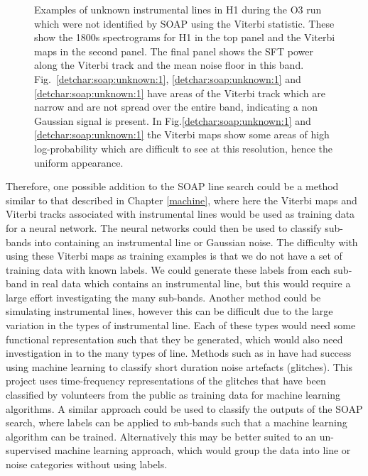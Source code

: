 \begin{figure}[hpt]
	\caption[lines from unknown sources]{Examples of unknown instrumental lines in H1 during the O3 run which were not identified by SOAP using the Viterbi statistic. These show the 1800s spectrograms for H1 in the top panel and the Viterbi maps in the second panel. The final panel shows the \gls{SFT} power along the Viterbi track and the mean noise floor in this band.  Fig.~\ref{detchar:soap:unknown:1}, \ref{detchar:soap:unknown:1} and \ref{detchar:soap:unknown:1} have areas of the Viterbi track which are narrow and are not spread over the entire band, indicating a non Gaussian signal is present. In Fig.\ref{detchar:soap:unknown:1} and \ref{detchar:soap:unknown:1} the Viterbi maps show some areas of high log-probability which are difficult to see at this resolution, hence the uniform appearance. }
	\label{detchar:soap:unknown}
\end{figure}
%

Therefore, one possible addition to the SOAP line search could be a method similar to that described in Chapter \ref{machine}, where here the Viterbi maps and Viterbi tracks associated with instrumental lines would be used as training data for a neural network. 
The neural networks could then be used to classify sub-bands into containing an instrumental line or Gaussian noise.
The difficulty with using these Viterbi maps as training examples is that we
do not have a set of training data with known labels. 
We could generate these labels from each sub-band in real data which contains an instrumental line, but this would require a large effort investigating the many sub-bands. Another method could be simulating instrumental lines, however this can be difficult due to the large variation in the types of instrumental line. Each of these types would need some functional representation such that they be generated, which would also need investigation in to the many types of line.
Methods such as in \citep{zevin2017GravitySpy} have had success using machine learning to classify short duration noise artefacts (glitches). This project uses time-frequency representations of the glitches that have been classified by volunteers from the public as training data for machine learning algorithms.
A similar approach could be used to classify the outputs of the SOAP search, where labels can be applied to sub-bands such that a machine learning algorithm can be trained.
Alternatively this may be better suited to an un-supervised machine learning approach, which would group the data into line or noise categories without using labels.


